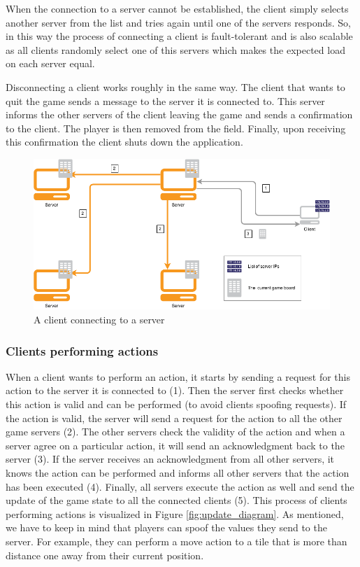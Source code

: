 When the connection to a server cannot be established, the client simply selects another server from the list and tries again until one of the servers responds. 
So, in this way the process of connecting a client is fault-tolerant and is also scalable as all clients randomly select one of this servers which makes the expected load on each server equal.

Disconnecting a client works roughly in the same way. 
The client that wants to quit the game sends a message to the server it is connected to. 
This server informs the other servers of the client leaving the game and sends a confirmation to the client. 
The player is then removed from the field. Finally, upon receiving this confirmation the client shuts down the application.

\begin{figure}[h!]
  \centering
    \includegraphics[width=\textwidth]{diagrams/connecting-client}
    
  \caption{A client connecting to a server}
  \label{fig:connect_diagram}
\end{figure}

\subsubsection{Clients performing actions}
\label{subsubsec:clients_actions}
When a client wants to perform an action, it starts by sending a request for this action to the server it is connected to (1). 
Then the server first checks whether this action is valid and can be performed (to avoid clients spoofing requests). 
If the action is valid, the server will send a request for the action to all the other game servers (2). 
The other servers check the validity of the action and when a server agree on a particular action, it will send an acknowledgment back to the server (3). 
If the server receives an acknowledgment from all other servers, it knows the action can be performed and informs all other servers that the action has been executed (4). 
Finally, all servers execute the action as well and send the update of the game state to all the connected clients (5). 
This process of clients performing actions is visualized in Figure \ref{fig:update_diagram}. 
As mentioned, we have to keep in mind that players can spoof the values they send to the server. 
For example, they can perform a move action to a tile that is more than distance one away from their current position.

